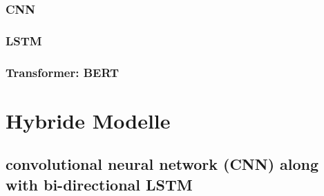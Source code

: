 \subsubsection{CNN}

\subsubsection{LSTM}

\subsubsection{Transformer: BERT}


\section{Hybride Modelle}
\label{sec:hybride_modelle}

\subsection{convolutional neural network (CNN) along with bi-directional LSTM}

\cite{Buddhadev2025}


